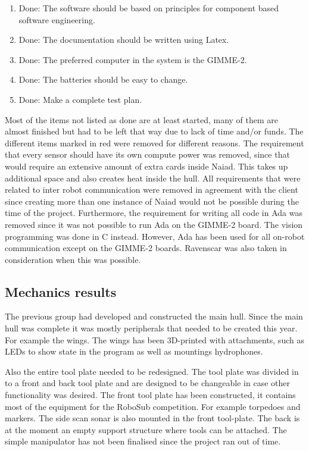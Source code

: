 \begin{enumerate}
\begin{enumerate}
\item {\color{green}Done: The software should be based on principles for component based software engineering.} 
\item {\color{green}Done: The documentation should be written using Latex.}
\item {\color{green}Done: The preferred computer in the system is the GIMME-2.}
\item {\color{green}Done: The batteries should be easy to change.}
\item {\color{green}Done: Make a complete test plan.}
\end{enumerate}
\end{enumerate}

Most of the items not listed as done are at least started, many of them are almost finished but had to be left that way due to lack of time and\slash or funds. The different items marked in red were removed for different reasons. The requirement that every sensor should have its own compute power was removed, since that would require an extensive amount of extra cards inside Naiad. This takes up additional space and also creates heat inside the hull. All requirements that were related to inter robot communication were removed in agreement with the client since creating more than one instance of Naiad would not be possible during the time of the project. Furthermore, the requirement for writing all code in Ada was removed since it was not possible to run Ada on the GIMME-2 board. The vision programming was done in C instead. However, Ada has been used for all on-robot communication except on the GIMME-2 boards. Ravenscar was also taken in consideration when this was possible. 
\subsection{Mechanics results}
The previous group had developed and constructed the main hull. Since the main hull was complete it was mostly peripherals that needed to be created this year. For example the wings. The wings has been 3D-printed with attachments, such as LEDs to show state in the program as well as mountings hydrophones. 

Also the entire tool plate needed to be redesigned. The tool plate was divided in to a front and back tool plate and are designed to be changeable in case other functionality was desired. The front tool plate has been constructed, it contains most of the equipment for the RoboSub competition. For example torpedoes and markers. The side scan sonar is also mounted in the front tool-plate. The back is at the moment an empty support structure where tools can be attached. The simple manipulator has not been finalised since the project ran out of time. 

